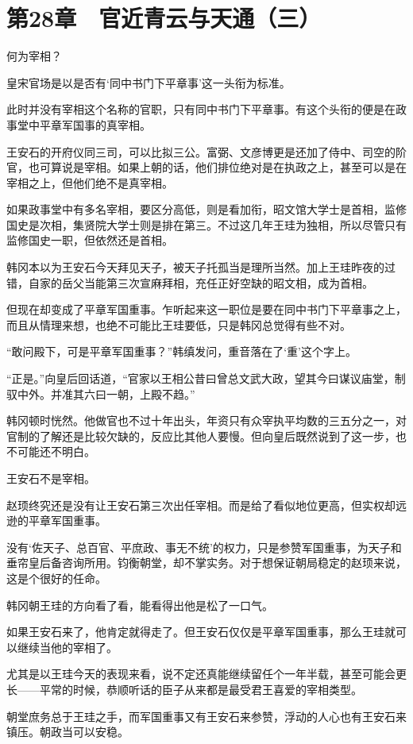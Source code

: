 \section{第28章　官近青云与天通（三）}

何为宰相？

皇宋官场是以是否有‘同中书门下平章事’这一头衔为标准。

此时并没有宰相这个名称的官职，只有同中书门下平章事。有这个头衔的便是在政事堂中平章军国事的真宰相。

王安石的开府仪同三司，可以比拟三公。富弼、文彦博更是还加了侍中、司空的阶官，也可算说是宰相。如果上朝的话，他们排位绝对是在执政之上，甚至可以是在宰相之上，但他们绝不是真宰相。

如果政事堂中有多名宰相，要区分高低，则是看加衔，昭文馆大学士是首相，监修国史是次相，集贤院大学士则是排在第三。不过这几年王珪为独相，所以尽管只有监修国史一职，但依然还是首相。

韩冈本以为王安石今天拜见天子，被天子托孤当是理所当然。加上王珪昨夜的过错，自家的岳父当能第三次宣麻拜相，充任正好空缺的昭文相，成为首相。

但现在却变成了平章军国重事。乍听起来这一职位是要在同中书门下平章事之上，而且从情理来想，也绝不可能比王珪要低，只是韩冈总觉得有些不对。

“敢问殿下，可是平章军国重事？”韩缜发问，重音落在了‘重’这个字上。

“正是。”向皇后回话道，“官家以王相公昔曰曾总文武大政，望其今曰谋议庙堂，制驭中外。并准其六曰一朝，上殿不趋。”

韩冈顿时恍然。他做官也不过十年出头，年资只有众宰执平均数的三五分之一，对官制的了解还是比较欠缺的，反应比其他人要慢。但向皇后既然说到了这一步，也不可能还不明白。

王安石不是宰相。

赵顼终究还是没有让王安石第三次出任宰相。而是给了看似地位更高，但实权却远逊的平章军国重事。

没有‘佐天子、总百官、平庶政、事无不统’的权力，只是参赞军国重事，为天子和垂帘皇后备咨询所用。钧衡朝堂，却不掌实务。对于想保证朝局稳定的赵顼来说，这是个很好的任命。

韩冈朝王珪的方向看了看，能看得出他是松了一口气。

如果王安石来了，他肯定就得走了。但王安石仅仅是平章军国重事，那么王珪就可以继续当他的宰相了。

尤其是以王珪今天的表现来看，说不定还真能继续留任个一年半载，甚至可能会更长——平常的时候，恭顺听话的臣子从来都是最受君王喜爱的宰相类型。

朝堂庶务总于王珪之手，而军国重事又有王安石来参赞，浮动的人心也有王安石来镇压。朝政当可以安稳。

